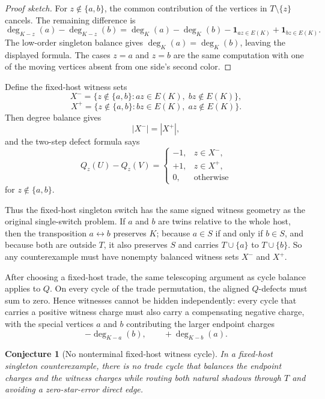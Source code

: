 \documentclass[11pt]{article}
\newtheorem{conjecture}{Conjecture}
\newcommand{\one}{\mathbf{1}}
\begin{document}
\begin{proof}[Proof sketch]
For \(z\notin\{a,b\}\), the common contribution of the vertices in
\(T\setminus\{z\}\) cancels.  The remaining difference is
\[
  \deg_{K-z}(a)-\deg_{K-z}(b)
  =
  \deg_K(a)-\deg_K(b)-\one_{az\in E(K)}+\one_{bz\in E(K)}.
\]
The low-order singleton balance gives \(\deg_K(a)=\deg_K(b)\), leaving the
displayed formula.  The cases \(z=a\) and \(z=b\) are the same computation
with one of the moving vertices absent from one side's second color.
\end{proof}

Define the fixed-host witness sets
\[
  X^-=\{z\notin\{a,b\}:az\in E(K),\; bz\notin E(K)\},
\]
\[
  X^+=\{z\notin\{a,b\}:bz\in E(K),\; az\notin E(K)\}.
\]
Then degree balance gives
\[
  |X^-|=|X^+|,
\]
and the two-step defect formula says
\[
  Q_z(U)-Q_z(V)=
  \begin{cases}
    -1, & z\in X^-,\\
    +1, & z\in X^+,\\
    0, & \text{otherwise}
  \end{cases}
\]
for \(z\notin\{a,b\}\).

Thus the fixed-host singleton switch has the same signed witness geometry as
the original single-switch problem.  If \(a\) and \(b\) are twins relative to
the whole host, then the transposition \(a\leftrightarrow b\) preserves \(K\);
because \(a\in S\) if and only if \(b\in S\), and because both are outside
\(T\), it also preserves \(S\) and carries \(T\cup\{a\}\) to
\(T\cup\{b\}\).  So any counterexample must have nonempty balanced witness
sets \(X^-\) and \(X^+\).

After choosing a fixed-host trade, the same telescoping argument as cycle
balance applies to \(Q\).  On every cycle of the trade permutation, the
aligned \(Q\)-defects must sum to zero.  Hence witnesses cannot be hidden
independently: every cycle that carries a positive witness charge must also
carry a compensating negative charge, with the special vertices \(a\) and
\(b\) contributing the larger endpoint charges
\[
  -\deg_{K-a}(b),
  \qquad
  +\deg_{K-b}(a).
\]

\begin{conjecture}[No nonterminal fixed-host witness cycle]
In a fixed-host singleton counterexample, there is no trade cycle that
balances the endpoint charges and the witness charges while routing both
natural shadows through \(T\) and avoiding a zero-star-error direct edge.
\end{conjecture}
\end{document}
